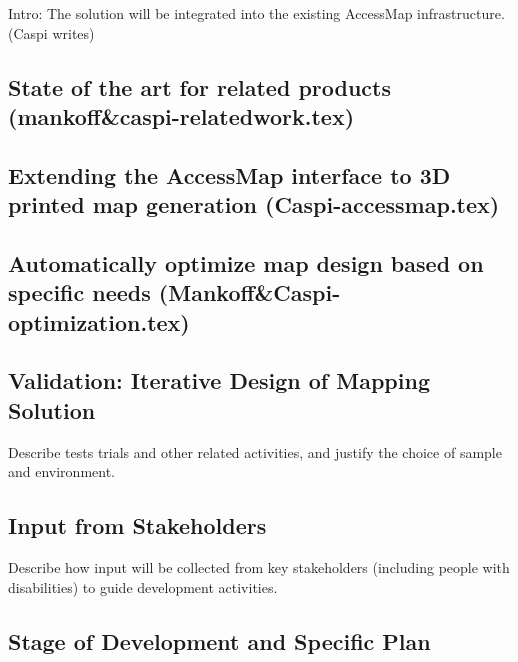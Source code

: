 Intro: The solution will be integrated into the existing AccessMap infrastructure.
(Caspi writes)


\subsection{State of the art for related products (mankoff\&caspi-relatedwork.tex)}


\subsection{Extending the AccessMap interface to 3D printed map generation (Caspi-accessmap.tex)}


\subsection{Automatically optimize map design based on specific needs (Mankoff\&Caspi-optimization.tex)}



\subsection{Validation: Iterative Design of Mapping Solution}

Describe tests trials and other related activities, and justify the choice of sample and environment. 



\subsection{Input from Stakeholders}
Describe how input will be collected from key stakeholders (including people with disabilities) to guide development activities.

\subsection{Stage of Development and Specific Plan}

